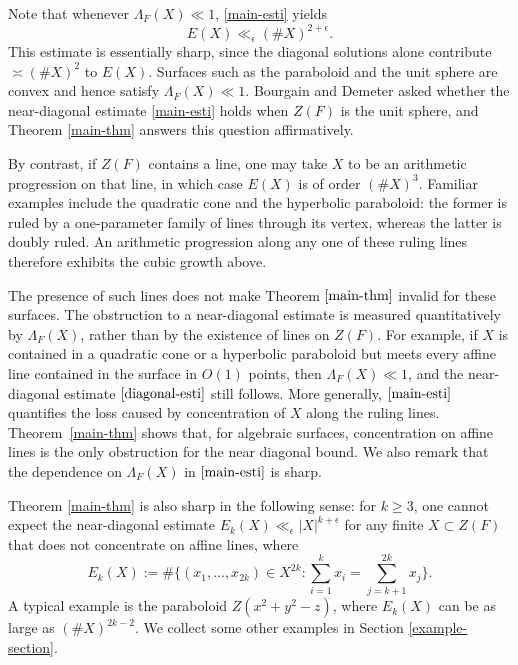 \documentclass{amsart}%
\numberwithin{equation}{section}
\newcommand{\e}{\epsilon}
\newcommand{\1}{\mathbbm{1}}
\begin{document}
Note that whenever $\Lambda_{F}(X)\ll 1$,  \eqref{main-esti} yields
\begin{equation}
\label{diagonal-esti}
    E(X)\ll_{\e}(\#X)^{2+\e}.
\end{equation}
This estimate is essentially sharp, since the diagonal solutions alone contribute $\asymp (\#X)^2$ to $E(X)$.
Surfaces such as the paraboloid and the unit sphere are convex and hence satisfy $\Lambda_F(X)\ll 1$. 
Bourgain and Demeter \cite{Bourgain-Demeter} asked whether the near-diagonal estimate \eqref{main-esti} holds when $Z(F)$ is the unit sphere, and Theorem \ref{main-thm} answers this question affirmatively.

\medskip 




By contrast, if $Z(F)$ contains a line, one may take $X$ to be an arithmetic progression on that line, in which case $E(X)$ is of order $(\#X)^3$. 
Familiar examples include the quadratic cone and the hyperbolic paraboloid: the former is ruled by a one-parameter family of lines through its vertex, whereas the latter is doubly ruled. An arithmetic progression along any one of these ruling lines therefore exhibits the cubic growth above.

The presence of such lines does not make Theorem $\ref{main-thm}$ invalid for these surfaces. The obstruction to a near-diagonal estimate is measured quantitatively by $\Lambda_F(X)$, rather than by the existence of lines on $Z(F)$. 
For example, if $X$ is contained in a quadratic cone or a hyperbolic paraboloid but meets every affine line contained in the surface in $O(1)$ points, then $\Lambda_F(X)\ll1$, and the near-diagonal estimate $\eqref{diagonal-esti}$ still follows. 
More generally, $\eqref{main-esti}$ quantifies the loss caused by concentration of $X$ along the ruling lines. 
Theorem~\ref{main-thm} shows that, for algebraic surfaces, concentration on affine lines is the only obstruction for the near diagonal bound. We also remark that the dependence on $\Lambda_F(X)$ in $\eqref{main-esti}$ is sharp.

Theorem \ref{main-thm} is also sharp in the following sense: for $k\geq 3$, one cannot expect the near-diagonal estimate $E_k(X)\ll_\epsilon |X|^{k+\epsilon}$ for any finite $X\subset Z(F)$ that does not concentrate on affine lines,
where
\[
    E_k(X)
    :=
    \#\{(x_1,\ldots,x_{2k})\in X^{2k}:
    \sum_{i=1}^kx_i
    =
    \sum_{j=k+1}^{2k}x_j\}.
\]
A typical example is the paraboloid $Z(x^2+y^2-z)$, where $E_k(X)$ can be as large as $(\#X)^{2k-2}$.
We collect some other examples in Section \ref{example-section}.
\end{document}
